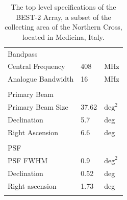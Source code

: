 \documentclass[useAMS,macros,usenatbib]{mn2e}
\begin{document}
\begin{table}
\begin{tabular}{| l | l | l |}
				      &            &            	\\
      \hline
      Bandpass        		&            &       		\\
      \hline
      Central Frequency 		&        408 &        MHz 	\\
      Analogue Bandwidth 		&         16 &        MHz 	\\
				      &            &            	\\
      \hline
      Primary Beam 			&            &           	\\
      \hline
      Primary Beam Size 		&      37.62 & $\textrm{deg}^2$ \\
      Declination 			&        5.7 &        deg 	\\
      Right Ascension 		&        6.6 &        deg 	\\
				      &            &            	\\
      \hline
      PSF    				&            &       		\\
      \hline
      PSF FWHM 			&        0.9 & $\textrm{deg}^2$ \\
      Declination 			&       0.52 &     deg 		\\
      Right ascension 		&       1.73 &     deg 		\\
				      &            &            	\\
      \hline
      \end{tabular}
      \caption{The top level specifications of the BEST-2 Array, a subset of the collecting area of the Northern Cross, located in Medicina, Italy.}
      \label{tbl:best2}
\end{table}

\end{document}
